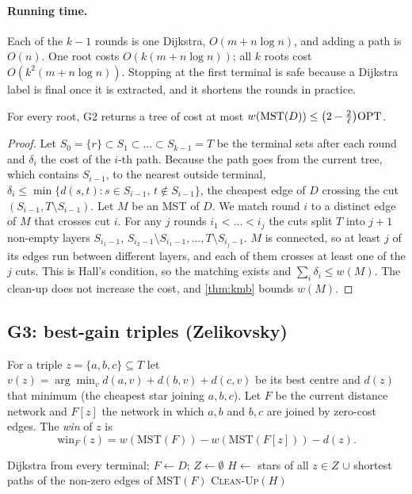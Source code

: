 \paragraph{Running time.} Each of the \(k-1\) rounds is one Dijkstra, \(O(m+n\log n)\), and adding a path is \(O(n)\). One root
costs \(O(k(m+n\log n))\); all \(k\) roots cost \(O(k^2(m+n\log n))\). Stopping at the first terminal is safe because a Dijkstra
label is final once it is extracted, and it shortens the rounds in practice.

\begin{theorem}\label{thm:sph}
For every root, G2 returns a tree of cost at most \(w(\mathrm{MST}(D))\le\big(2-\tfrac2\ell\big)\mathrm{OPT}\).
\end{theorem}
\begin{proof}
Let \(S_0=\{r\}\subset S_1\subset\dots\subset S_{k-1}=T\) be the terminal sets after each round and \(\delta_i\) the cost of the
\(i\)-th path. Because the path goes from the current tree, which contains \(S_{i-1}\), to the nearest outside terminal,
\(\delta_i\le\min\{d(s,t):s\in S_{i-1},\,t\notin S_{i-1}\}\), the cheapest edge of \(D\) crossing the cut \((S_{i-1},T\setminus S_{i-1})\).
Let \(M\) be an MST of \(D\). We match round \(i\) to a distinct edge of \(M\) that crosses cut \(i\). For any \(j\) rounds
\(i_1<\dots<i_j\) the cuts split \(T\) into \(j+1\) non-empty layers \(S_{i_1-1},\,S_{i_2-1}\setminus S_{i_1-1},\dots,T\setminus S_{i_j-1}\).
\(M\) is connected, so at least \(j\) of its edges run between different layers, and each of them crosses at least one of the
\(j\) cuts. This is Hall's condition, so the matching exists and \(\sum_i\delta_i\le w(M)\). The clean-up does not increase the
cost, and \cref{thm:kmb} bounds \(w(M)\).
\end{proof}

\subsection{G3: best-gain triples (Zelikovsky)}
For a triple \(z=\{a,b,c\}\subseteq T\) let \(v(z)=\arg\min_v d(a,v)+d(b,v)+d(c,v)\) be its best centre and \(d(z)\) that
minimum (the cheapest star joining \(a,b,c\)). Let \(F\) be the current distance network and \(F[z]\) the network in which
\(a,b\) and \(b,c\) are joined by zero-cost edges. The \emph{win} of \(z\) is
\[\mathrm{win}_F(z)=w(\mathrm{MST}(F))-w(\mathrm{MST}(F[z]))-d(z).\]

\begin{algorithm}[!htbp]
Dijkstra from every terminal; \(F\gets D\); \(Z\gets\emptyset\)\;
\(H\gets\) stars of all \(z\in Z\) \(\cup\) shortest paths of the non-zero edges of \(\mathrm{MST}(F)\)\;
\Return \textsc{Clean-Up}\((H)\)\;
\caption{G3 (\texttt{src/greedy3\_zelikovsky.cpp}).}
\end{algorithm}

